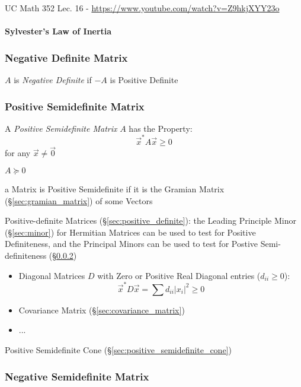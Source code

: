 UC Math 352 Lec. 16 - \url{https://www.youtube.com/watch?v=Z9hkjXYY23o}



\paragraph{Sylvester's Law of Inertia}\label{sec:sylversters_law}\hfill



\subsubsection{Negative Definite Matrix}\label{sec:negative_definite}

$A$ is \emph{Negative Definite} if $-A$ is Positive Definite



\subsubsection{Positive Semidefinite Matrix}\label{sec:positive_semidefinite}

A \emph{Positive Semidefinite Matrix} $A$ has the Property:
\[
  \vec{x}^* A \vec{x} \geq 0
\]
for any $\vec{x} \neq \vec{0}$

$A \succeq 0$

a Matrix is Positive Semidefinite if it is the Gramian Matrix
(\S\ref{sec:gramian_matrix}) of some Vectors

Positive-definite Matrices (\S\ref{sec:positive_definite}): the Leading
Principle Minor (\S\ref{sec:minor}) for Hermitian Matrices can be used to test
for Positive Definiteness, and the Principal Minors can be used to test for
Postive Semi-definiteness (\S\ref{sec:positive_semidefinite})

\begin{itemize}
  \item Diagonal Matrices $D$ with Zero or Positive Real Diagonal entries
    ($d_{ii} \geq 0$):
    \[
      \vec{x}^*D\vec{x} = \sum d_{ii}|x_i|^2 \geq 0
    \]
  \item Covariance Matrix (\S\ref{sec:covariance_matrix})
  \item ...
\end{itemize}

\fist Positive Semidefinite Cone (\S\ref{sec:positive_semidefinite_cone})



\subsubsection{Negative Semidefinite Matrix}\label{sec:negative_semidefinite}


